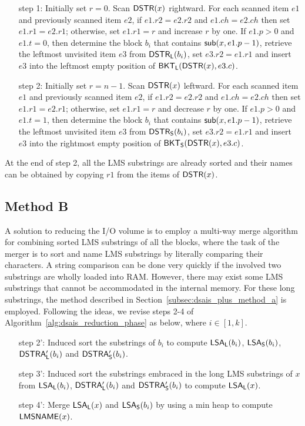 \documentclass[10pt,journal,compsoc]{IEEEtran}
\begin{document}
\begin{itemize}[itemindent = 5ex]
	\item[step 1:] Initially set $r = 0$. Scan ${\sf DSTR}(x)$ rightward. For each scanned item $e1$ and previously scanned item $e2$, if $e1.r2 = e2.r2$ and $e1.ch = e2.ch$ then set $e1.r1 = e2.r1$; otherwise, set $e1.r1 = r$ and increase $r$ by one. If $e1.p > 0$ and $e1.t = 0$, then determine the block $b_i$ that contains ${\sf sub}(x, e1.p - 1)$, retrieve the leftmost unvisited item $e3$ from ${\sf DSTR_L}(b_i)$, set $e3.r2 = e1.r1$ and insert $e3$ into the leftmost empty position of ${\sf BKT_L}({\sf DSTR}(x), e3.c)$.
	
	\item[step 2:] Initially set $r = n - 1$. Scan ${\sf DSTR}(x)$ leftward. For each scanned item $e1$ and previously scanned item $e2$, if $e1.r2 = e2.r2$ and $e1.ch = e2.ch$ then set $e1.r1 = e2.r1$; otherwise, set $e1.r1 = r$ and decrease $r$ by one. If $e1.p > 0$ and $e1.t = 1$, then determine the block $b_i$ that contains ${\sf sub}(x, e1.p - 1)$, retrieve the leftmost unvisited item $e3$ from ${\sf DSTR_S}(b_i)$, set $e3.r2 = e1.r1$ and insert $e3$ into the rightmost empty position of ${\sf BKT_S}({\sf DSTR}(x), e3.c)$.
	
\end{itemize}

At the end of step 2, all the LMS substrings are already sorted and their names can be obtained by copying $r1$ from the items of ${\sf DSTR}(x)$.

\subsection{Method B} \label{subsec:dsais_plus_method_b}
A solution to reducing the I/O volume is to employ a multi-way merge algorithm for combining sorted LMS substrings of all the blocks, where the task of the merger is to sort and name LMS substrings by literally comparing their characters. A string comparison can be done very quickly if the involved two substrings are wholly loaded into RAM. However, there may exist some LMS substrings that cannot be accommodated in the internal memory. For these long substrings, the method described in Section~\ref{subsec:dsais_plus_method_a} is employed. Following the ideas, we revise steps 2-4 of Algorithm~\ref{alg:dsais_reduction_phase} as below, where $i \in [1, k]$.

\begin{itemize}[itemindent = 5ex]
	\item [step 2':] Induced sort the substrings of $b_i$ to compute ${\sf LSA_L}(b_i)$, ${\sf LSA_S}(b_i)$, ${\sf DSTRA_L'}(b_i)$ and ${\sf DSTRA_S'}(b_i)$.
	
	\item [step 3':] Induced sort the substrings embraced in the long LMS substrings of $x$ from ${\sf LSA_L}(b_i)$, ${\sf DSTRA_L'}(b_i)$ and ${\sf DSTRA_S'}(b_i)$ to compute ${\sf LSA_L}(x)$.
	
	\item [step 4':] Merge ${\sf LSA_L}(x)$ and ${\sf LSA_S}(b_i)$ by using a min heap to compute ${\sf LMSNAME}(x)$.
	
\end{itemize}
\end{document}
